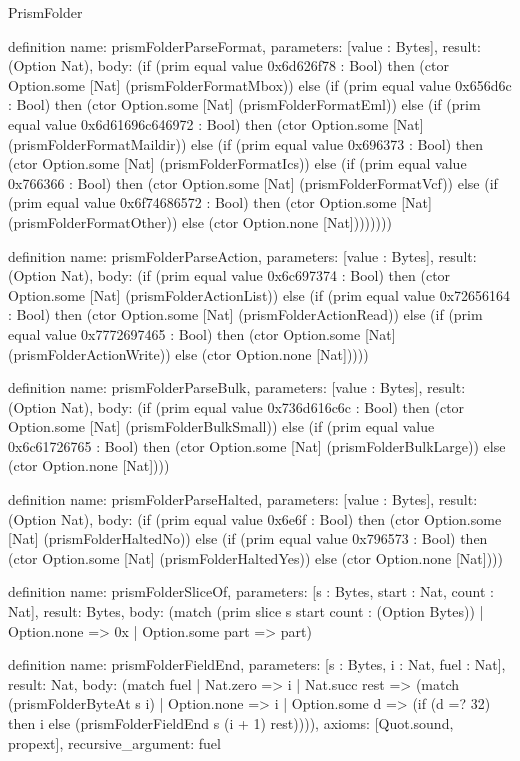 \begin{lexlean}{PrismFolder}
\begin{semanticmodule}
definition{
  name: prismFolderParseFormat,
  parameters: [value : Bytes],
  result: (Option Nat),
  body: (if (prim equal value 0x6d626f78 : Bool) then (ctor Option.some [Nat] (prismFolderFormatMbox)) else (if (prim equal value 0x656d6c : Bool) then (ctor Option.some [Nat] (prismFolderFormatEml)) else (if (prim equal value 0x6d61696c646972 : Bool) then (ctor Option.some [Nat] (prismFolderFormatMaildir)) else (if (prim equal value 0x696373 : Bool) then (ctor Option.some [Nat] (prismFolderFormatIcs)) else (if (prim equal value 0x766366 : Bool) then (ctor Option.some [Nat] (prismFolderFormatVcf)) else (if (prim equal value 0x6f74686572 : Bool) then (ctor Option.some [Nat] (prismFolderFormatOther)) else (ctor Option.none [Nat])))))))
}

definition{
  name: prismFolderParseAction,
  parameters: [value : Bytes],
  result: (Option Nat),
  body: (if (prim equal value 0x6c697374 : Bool) then (ctor Option.some [Nat] (prismFolderActionList)) else (if (prim equal value 0x72656164 : Bool) then (ctor Option.some [Nat] (prismFolderActionRead)) else (if (prim equal value 0x7772697465 : Bool) then (ctor Option.some [Nat] (prismFolderActionWrite)) else (ctor Option.none [Nat]))))
}

definition{
  name: prismFolderParseBulk,
  parameters: [value : Bytes],
  result: (Option Nat),
  body: (if (prim equal value 0x736d616c6c : Bool) then (ctor Option.some [Nat] (prismFolderBulkSmall)) else (if (prim equal value 0x6c61726765 : Bool) then (ctor Option.some [Nat] (prismFolderBulkLarge)) else (ctor Option.none [Nat])))
}

definition{
  name: prismFolderParseHalted,
  parameters: [value : Bytes],
  result: (Option Nat),
  body: (if (prim equal value 0x6e6f : Bool) then (ctor Option.some [Nat] (prismFolderHaltedNo)) else (if (prim equal value 0x796573 : Bool) then (ctor Option.some [Nat] (prismFolderHaltedYes)) else (ctor Option.none [Nat])))
}

definition{
  name: prismFolderSliceOf,
  parameters: [s : Bytes, start : Nat, count : Nat],
  result: Bytes,
  body: (match (prim slice s start count : (Option Bytes))
    | Option.none => 0x
    | Option.some part => part)
}

definition{
  name: prismFolderFieldEnd,
  parameters: [s : Bytes, i : Nat, fuel : Nat],
  result: Nat,
  body: (match fuel
    | Nat.zero => i
    | Nat.succ rest => (match (prismFolderByteAt s i)
      | Option.none => i
      | Option.some d => (if (d =? 32) then i else (prismFolderFieldEnd s (i + 1) rest)))),
  axioms: [Quot.sound, propext],
  recursive_argument: fuel
}


\end{semanticmodule}
\end{lexlean}

